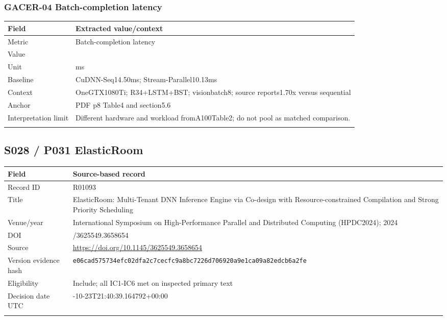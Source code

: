 \subsubsection*{GACER-04 Batch-completion latency}
\begin{longtable}{>{\raggedright\arraybackslash}p{}>{\raggedright\arraybackslash}p{}}
\toprule
\textbf{Field} & \textbf{Extracted value/context}\\\midrule\endhead
Metric & Batch-completion latency\\\addlinespace
Value & 8.51\\\addlinespace
Unit & ms\\\addlinespace
Baseline & CuDNN-Seq14.50ms;\allowbreak{} Stream-Parallel10.13ms\\\addlinespace
Context & OneGTX1080Ti;\allowbreak{} R34+LSTM+BST;\allowbreak{} visionbatch8;\allowbreak{} source reports1.70x versus sequential\\\addlinespace
Anchor & PDF p8 Table4 and section5.6\\\addlinespace
Interpretation limit & Different hardware and workload fromA100Table2;\allowbreak{} do not pool as matched comparison.\\\addlinespace
\bottomrule\end{longtable}
\clearpage\subsection{S028 / P031 ElasticRoom}
\cite{s028}
\begin{longtable}{>{\raggedright\arraybackslash}p{}>{\raggedright\arraybackslash}p{}}
\toprule
\textbf{Field} & \textbf{Source-based record}\\\midrule\endhead
Record ID & R01093\\\addlinespace
Title & ElasticRoom: Multi-Tenant DNN Inference Engine via Co-design with Resource-constrained Compilation and Strong Priority Scheduling\\\addlinespace
Venue/year & International Symposium on High-Performance Parallel and Distributed Computing (HPDC2024);\allowbreak{} 2024\\\addlinespace
DOI & 10.1145/3625549.3658654\\\addlinespace
Source & \url{https://doi.org/10.1145/3625549.3658654}\\\addlinespace
Version evidence hash & \nolinkurl{e06cad575734efc02dfa2c7cecfc9a8bc7226d706920a9e1ca09a82edcb6a2fe}\\\addlinespace
Eligibility & Include;\allowbreak{} all IC1-IC6 met on inspected primary text\\\addlinespace
Decision date UTC & 2026-10-23T21:40:39.164792+00:00\\\addlinespace
\bottomrule\end{longtable}
